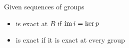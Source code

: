\documentclass{report}
\begin{document}
\begin{definition}[exact]
Given sequences of groups
\begin{itemize}
    \item
{}
is exact at $B$ if $\operatorname{im} i = \ker p$
    \item
{}
is exact if it is exact at every group

\end{itemize}

\end{definition}
\end{document}
